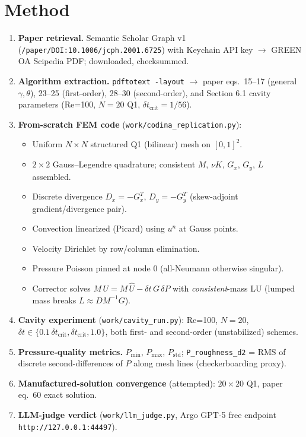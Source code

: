 \documentclass[11pt]{article}
\begin{document}
\section{Method}
\begin{enumerate}
  \item \textbf{Paper retrieval.} Semantic Scholar Graph v1
        (\texttt{/paper/DOI:10.1006/jcph.2001.6725}) with Keychain API key
        $\to$ GREEN OA Scipedia PDF; downloaded, checksummed.
  \item \textbf{Algorithm extraction.} \texttt{pdftotext -layout} $\to$ paper
        eqs.~15--17 (general $\gamma,\theta$), 23--25 (first-order), 28--30
        (second-order), and Section 6.1 cavity parameters
        (Re=100, $N=20$ Q1, $\delta t_{\text{crit}} = 1/56$).
  \item \textbf{From-scratch FEM code} (\texttt{work/codina\_replication.py}):
    \begin{itemize}
      \item Uniform $N\times N$ structured Q1 (bilinear) mesh on $[0,1]^2$.
      \item $2\times 2$ Gauss--Legendre quadrature; consistent $M$, $\nu K$,
            $G_x$, $G_y$, $L$ assembled.
      \item Discrete divergence $D_x = -G_x^T$, $D_y = -G_y^T$
            (skew-adjoint gradient/divergence pair).
      \item Convection linearized (Picard) using $u^n$ at Gauss points.
      \item Velocity Dirichlet by row/column elimination.
      \item Pressure Poisson pinned at node $0$ (all-Neumann otherwise singular).
      \item Corrector solves $M\,U = M\,\hat U - \delta t\,G\,\delta P$ with
            \emph{consistent}-mass LU (lumped mass breaks
            $L \approx D M^{-1} G$).
    \end{itemize}
  \item \textbf{Cavity experiment} (\texttt{work/cavity\_run.py}): Re=100,
        $N=20$, $\delta t \in \{0.1\,\delta t_{\text{crit}}, \delta t_{\text{crit}}, 1.0\}$,
        both first- and second-order (unstabilized) schemes.
  \item \textbf{Pressure-quality metrics.} $P_{\min}$, $P_{\max}$, $P_{\text{std}}$;
        \texttt{P\_roughness\_d2} = RMS of discrete second-differences of $P$
        along mesh lines (checkerboarding proxy).
  \item \textbf{Manufactured-solution convergence} (attempted): $20\times 20$
        Q1, paper eq.~60 exact solution.
  \item \textbf{LLM-judge verdict} (\texttt{work/llm\_judge.py}, Argo GPT-5
        free endpoint \texttt{http://127.0.0.1:44497}).
\end{enumerate}
\end{document}
